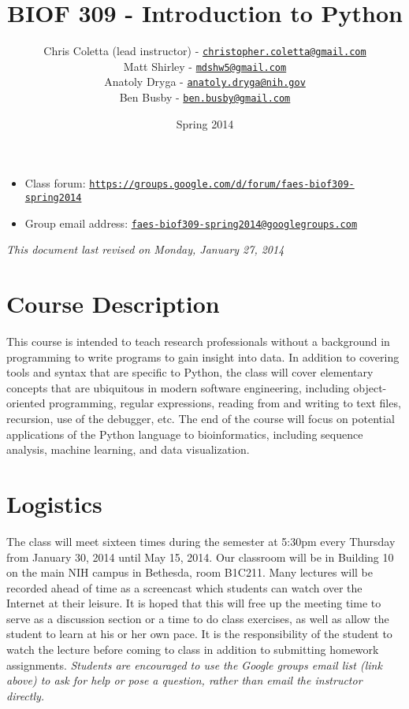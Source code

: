 \documentclass{article}
\title{BIOF 309 - Introduction to Python}  %
\date{Spring 2014}   %
\author{Chris Coletta (lead instructor) - \href{mailto:christopher.coletta@gmail.com}{\texttt{christopher.coletta@gmail.com}} \\ 
              Matt Shirley - \href{mailto:mdshw5@gmail.com}{\texttt{mdshw5@gmail.com}} \\
              Anatoly Dryga - \href{mailto:anatoly.dryga@nih.gov}{\texttt{anatoly.dryga@nih.gov}} \\
              Ben Busby - \href{mailto:ben.busby@gmail.com}{\texttt{ben.busby@gmail.com}} }    %
\begin{document}

\maketitle                 %


\begin{itemize}
   \item  Class forum: \href{https://groups.google.com/d/forum/faes_biof309_spring2014}{\texttt{https://groups.google.com/d/forum/faes-biof309-spring2014}}
   \item  Group email address: \href{mailto:faes-biof309-spring2014@googlegroups.com}{\texttt{faes-biof309-spring2014@googlegroups.com}}
\end{itemize}
\centerline{\textit{This document last revised on Monday, January 27, 2014}}
\section{Course Description}
This course is intended to teach research professionals without a background in programming to write programs to gain insight into data. In addition to covering tools and syntax that are specific to Python, the class will cover elementary concepts that are ubiquitous in modern software engineering, including object-oriented programming, regular expressions, reading from and writing to text files, recursion, use of the debugger, etc. The end of the course will focus on potential applications of the Python language to bioinformatics, including sequence analysis, machine learning, and data visualization.
\section{Logistics}
The class will meet sixteen times during the semester at 5:30pm every Thursday from January 30, 2014 until May 15, 2014. Our classroom will be in Building 10 on the main NIH campus in Bethesda, room B1C211. Many lectures will be recorded ahead of time as a screencast which students can watch over the Internet at their leisure. It is hoped that this will free up the meeting time to serve as a discussion section or a time to do class exercises, as well as allow the student to learn at his or her own pace. It is the responsibility of the student to watch the lecture before coming to class in addition to submitting homework assignments. \emph{Students are encouraged to use the Google groups email list (link above) to ask for help or pose a question, rather than email the instructor directly.} 
\end{document}
